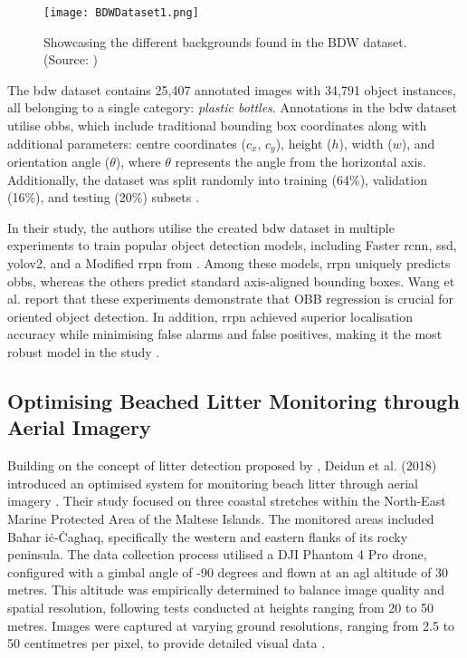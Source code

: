 \begin{figure}[!htbp]
    \centering
    \texttt{[image: BDWDataset1.png]}
    \caption{Showcasing the different backgrounds found in the BDW dataset. (Source: \cite{bdwdataset})}
    \label{fig:bdw}
\end{figure}

The \gls{bdw} dataset contains 25,407 annotated images with 34,791 object instances, all belonging to a single category: \textit{plastic bottles}. Annotations in the \gls{bdw} dataset utilise \gls{obbs}, which include traditional bounding box coordinates along with additional parameters: centre coordinates ($c_x$, $c_y$), height ($h$), width ($w$), and orientation angle ($\theta$), where $\theta$ represents the angle from the horizontal axis. Additionally, the dataset was split randomly into training (64\%), validation (16\%), and testing (20\%) subsets \cite{bdwdataset}.

In their study, the authors utilise the created \gls{bdw} dataset in multiple experiments to train popular object detection models, including Faster \gls{rcnn}, \gls{ssd}, \gls{yolo}v2, and a Modified \gls{rrpn} from \cite{rrpn}. Among these models,  \gls{rrpn} uniquely predicts \gls{obbs}, whereas the others predict standard axis-aligned bounding boxes. Wang et al. report that these experiments demonstrate that OBB regression is crucial for oriented object detection. In addition,  \gls{rrpn} achieved superior localisation accuracy while minimising false alarms and false positives, making it the most robust model in the study \cite{bdwdataset}.

\subsection{Optimising Beached Litter Monitoring through Aerial Imagery}%
\label{subsec:3_geosurvey}

Building on the concept of litter detection proposed by \cite{bdwdataset}, Deidun et al. (2018) introduced an optimised system for monitoring beach litter through aerial imagery \cite{umgeosurvey}. Their study focused on three coastal stretches within the North-East Marine Protected Area of the Maltese Islands. The monitored areas included Baħar iċ-Ċagħaq, specifically the western and eastern flanks of its rocky peninsula. 
The data collection process utilised a DJI Phantom 4 Pro drone, configured with a gimbal angle of -90 degrees and flown at an \gls{agl} altitude of 30 metres. This altitude was empirically determined to balance image quality and spatial resolution, following tests conducted at heights ranging from 20 to 50 metres. Images were captured at varying ground resolutions, ranging from 2.5 to 50 centimetres per pixel, to provide detailed visual data \cite{umgeosurvey}.

